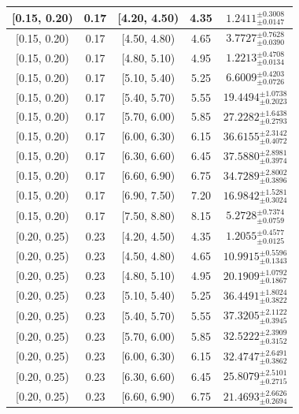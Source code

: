 \begin{longtable}{|c|c|c|c|c|}
\hline
[0.15, 0.20) & 0.17 & [4.20, 4.50) & 4.35 & $1.2411^{ \pm 0.3008 }_{ \pm 0.0147 }$ \\ 
\hline
[0.15, 0.20) & 0.17 & [4.50, 4.80) & 4.65 & $3.7727^{ \pm 0.7628 }_{ \pm 0.0390 }$ \\ 
\hline
[0.15, 0.20) & 0.17 & [4.80, 5.10) & 4.95 & $1.2213^{ \pm 0.4708 }_{ \pm 0.0134 }$ \\ 
\hline
[0.15, 0.20) & 0.17 & [5.10, 5.40) & 5.25 & $6.6009^{ \pm 0.4203 }_{ \pm 0.0726 }$ \\ 
\hline
[0.15, 0.20) & 0.17 & [5.40, 5.70) & 5.55 & $19.4494^{ \pm 1.0738 }_{ \pm 0.2023 }$ \\ 
\hline
[0.15, 0.20) & 0.17 & [5.70, 6.00) & 5.85 & $27.2282^{ \pm 1.6438 }_{ \pm 0.2793 }$ \\ 
\hline
[0.15, 0.20) & 0.17 & [6.00, 6.30) & 6.15 & $36.6155^{ \pm 2.3142 }_{ \pm 0.4072 }$ \\ 
\hline
[0.15, 0.20) & 0.17 & [6.30, 6.60) & 6.45 & $37.5880^{ \pm 2.8981 }_{ \pm 0.3974 }$ \\ 
\hline
[0.15, 0.20) & 0.17 & [6.60, 6.90) & 6.75 & $34.7289^{ \pm 2.8002 }_{ \pm 0.3896 }$ \\ 
\hline
[0.15, 0.20) & 0.17 & [6.90, 7.50) & 7.20 & $16.9842^{ \pm 1.5281 }_{ \pm 0.3024 }$ \\ 
\hline
[0.15, 0.20) & 0.17 & [7.50, 8.80) & 8.15 & $5.2728^{ \pm 0.7374 }_{ \pm 0.0759 }$ \\ 
\hline
[0.20, 0.25) & 0.23 & [4.20, 4.50) & 4.35 & $1.2055^{ \pm 0.4577 }_{ \pm 0.0125 }$ \\ 
\hline
[0.20, 0.25) & 0.23 & [4.50, 4.80) & 4.65 & $10.9915^{ \pm 0.5596 }_{ \pm 0.1343 }$ \\ 
\hline
[0.20, 0.25) & 0.23 & [4.80, 5.10) & 4.95 & $20.1909^{ \pm 1.0792 }_{ \pm 0.1867 }$ \\ 
\hline
[0.20, 0.25) & 0.23 & [5.10, 5.40) & 5.25 & $36.4491^{ \pm 1.8024 }_{ \pm 0.3822 }$ \\ 
\hline
[0.20, 0.25) & 0.23 & [5.40, 5.70) & 5.55 & $37.3205^{ \pm 2.1122 }_{ \pm 0.3945 }$ \\ 
\hline
[0.20, 0.25) & 0.23 & [5.70, 6.00) & 5.85 & $32.5222^{ \pm 2.3909 }_{ \pm 0.3152 }$ \\ 
\hline
[0.20, 0.25) & 0.23 & [6.00, 6.30) & 6.15 & $32.4747^{ \pm 2.6491 }_{ \pm 0.3862 }$ \\ 
\hline
[0.20, 0.25) & 0.23 & [6.30, 6.60) & 6.45 & $25.8079^{ \pm 2.5101 }_{ \pm 0.2715 }$ \\ 
\hline
[0.20, 0.25) & 0.23 & [6.60, 6.90) & 6.75 & $21.4693^{ \pm 2.6626 }_{ \pm 0.2694 }$ \\ 

\end{longtable}
